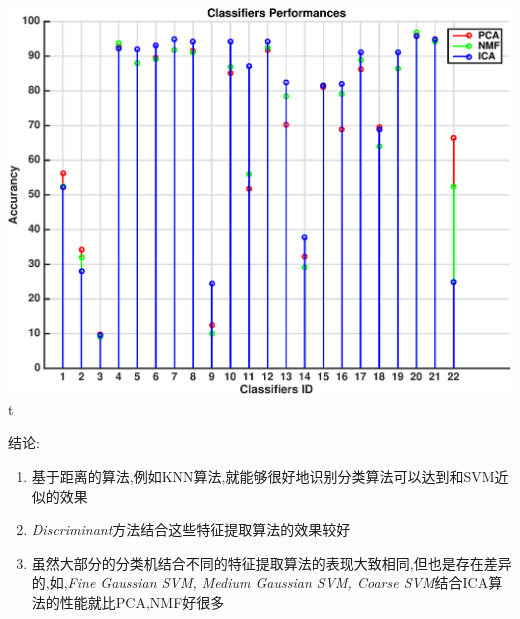 	\begin{center}
	\begin{minipage}[t]{\linewidth}
	\center
	{
	\includegraphics[width=\textwidth]{Img/pni_res} 
	}t
	\end{minipage}
	\medskip
	\end{center}
	
结论:
\begin{enumerate}
	\item 基于距离的算法,例如KNN算法,就能够很好地识别分类算法可以达到和SVM近似的效果
	\item \textit{Discriminant}方法结合这些特征提取算法的效果较好
	\item 虽然大部分的分类机结合不同的特征提取算法的表现大致相同,但也是存在差异的,如,\textit{Fine Gaussian SVM, Medium Gaussian SVM, Coarse SVM}结合ICA算法的性能就比PCA,NMF好很多
\end{enumerate}

	

	